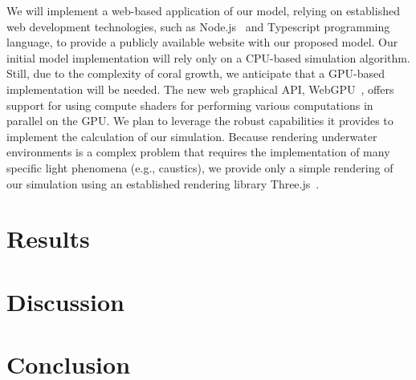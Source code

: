 \documentclass[9pt]{pnas-new}
\newcommand{\eg}{e.g., }
\begin{document}
We will implement a web-based application of our model, relying on established web development technologies, such as Node.js~\cite{nodejs} and Typescript programming language, to provide a publicly available website with our proposed model. Our initial model implementation will rely only on a CPU-based simulation algorithm. Still, due to the complexity of coral growth, we anticipate that a GPU-based implementation will be needed. The new web graphical API, WebGPU~\cite{webgpu}, offers support for using compute shaders for performing various computations in parallel on the GPU. We plan to leverage the robust capabilities it provides to implement the calculation of our simulation. Because rendering underwater environments is a complex problem that requires the implementation of many specific light phenomena (\eg caustics), we provide only a simple rendering of our simulation using an established rendering library Three.js~\cite{threejs}.

\section*{Results}

\section*{Discussion}

\section*{Conclusion}



\begin{multicols}{2}
\section*{\bibname}

\end{multicols}
\end{document}
